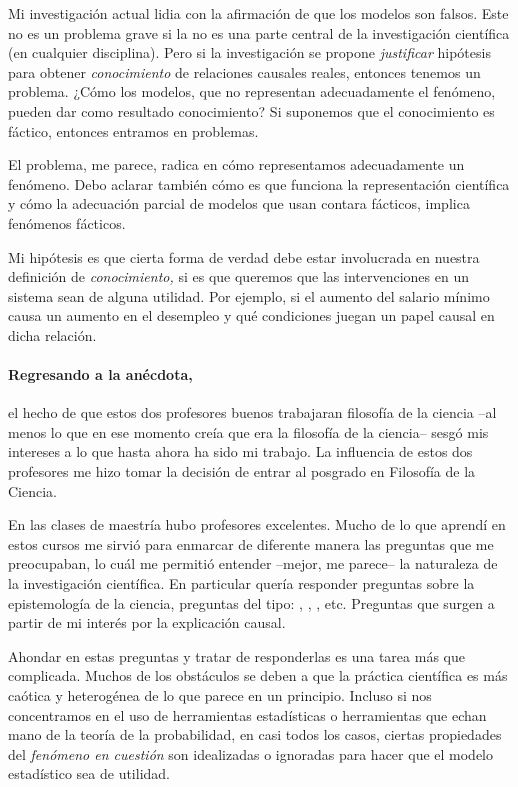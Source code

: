 Mi investigación actual lidia con la afirmación de que los modelos son falsos.
Este no es un problema grave si la  no es una parte central de la investigación científica (en cualquier disciplina).
Pero si la investigación se propone \emph{justificar} hipótesis para obtener \emph{conocimiento} de relaciones causales reales, entonces tenemos un problema.
¿Cómo los modelos, que no representan adecuadamente el fenómeno, pueden dar como resultado conocimiento?
Si suponemos que el conocimiento es fáctico, entonces entramos en problemas.

El problema, me parece, radica en cómo representamos adecuadamente un fenómeno.
Debo aclarar también cómo es que funciona la representación científica y cómo la adecuación parcial de modelos que usan contara fácticos, implica fenómenos fácticos.

Mi hipótesis es que cierta forma de verdad debe estar involucrada en nuestra definición de \emph{conocimiento,} si es que queremos que las intervenciones en un sistema sean de alguna utilidad.
Por ejemplo, si el aumento del salario mínimo causa un aumento en el desempleo y qué condiciones juegan un papel causal en dicha relación.

\paragraph{Regresando a la anécdota,} el hecho de que estos dos profesores buenos trabajaran filosofía de la
ciencia --al menos lo que en ese momento creía que era la filosofía de la ciencia-- sesgó mis intereses a lo que hasta ahora ha sido mi trabajo.
La influencia de estos dos profesores me hizo tomar la decisión de entrar al posgrado en Filosofía de la Ciencia.

En las clases de maestría hubo profesores excelentes.
Mucho de lo que aprendí en estos cursos me sirvió para enmarcar de diferente manera las preguntas que me preocupaban, lo cuál me permitió entender --mejor, me parece-- la naturaleza de la investigación científica.
En particular quería responder preguntas sobre la epistemología de la ciencia, preguntas del tipo: , , , etc.
Preguntas que surgen a partir de mi interés por la explicación causal.

Ahondar en estas preguntas y tratar de responderlas es una tarea más que complicada.
Muchos de los obstáculos se deben a que la práctica científica es más caótica y heterogénea de lo que parece en un principio.
Incluso si nos concentramos en el uso de herramientas estadísticas o herramientas que echan mano de la teoría de la probabilidad, en casi todos los casos, ciertas propiedades del \emph{fenómeno en cuestión} son idealizadas o ignoradas para hacer que el modelo estadístico sea de utilidad.

